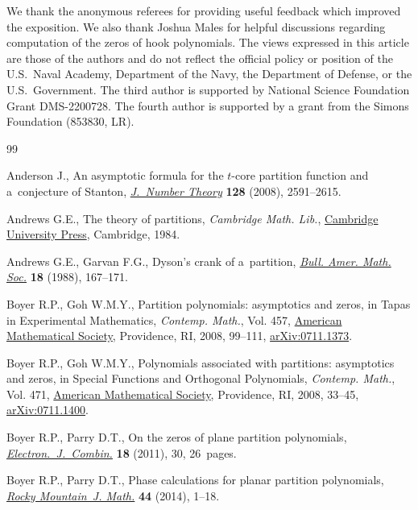 \documentclass[pdftex]{sigma}
\numberwithin{equation}{section}
\begin{document}
We thank the anonymous referees for providing useful feedback which improved the exposition. We also thank Joshua Males for helpful discussions regarding computation of the zeros of hook polynomials. The views expressed in this article are those of the authors and do not reflect the official policy or position of the U.S.\ Naval Academy, Department of the Navy, the Department of Defense, or the U.S.\ Government. The third author is supported by National Science Foundation Grant DMS-2200728.  The fourth author is supported by a grant from the Simons Foundation (853830, LR).

\newpage

\begin{thebibliography}{99}
\footnotesize\itemsep=0pt

Anderson J., An asymptotic formula for the {$t$}-core partition function and
 a~conjecture of {S}tanton, \href{https://doi.org/10.1016/j.jnt.2007.10.006}{\textit{J.~Number Theory}} \textbf{128} (2008),
 2591--2615.

Andrews G.E., The theory of partitions, \textit{Cambridge Math. Lib.}, \href{https://doi.org/10.1017/CBO9780511608650}{Cambridge
 University Press}, Cambridge, 1984.

Andrews G.E., Garvan F.G., Dyson's crank of a~partition, \href{https://doi.org/10.1090/S0273-0979-1988-15637-6}{\textit{Bull. Amer.
 Math. Soc.}} \textbf{18} (1988), 167--171.

Boyer R.P., Goh W.M.Y., Partition polynomials: asymptotics and zeros, in Tapas
 in Experimental Mathematics, \textit{Contemp. Math.}, Vol. 457, \href{https://doi.org/10.1090/conm/457/08904}{American
 Mathematical Society}, Providence, RI, 2008, 99--111, \href{https://arxiv.org/abs/0711.1373}{arXiv:0711.1373}.

Boyer R.P., Goh W.M.Y., Polynomials associated with partitions: asymptotics and
 zeros, in Special Functions and Orthogonal Polynomials, \textit{Contemp.
 Math.}, Vol. 471, \href{https://doi.org/10.1090/conm/471/09204}{American Mathematical Society}, Providence, RI, 2008,
 33--45, \href{https://arxiv.org/abs/0711.1400}{arXiv:0711.1400}.


Boyer R.P., Parry D.T., On the zeros of plane partition polynomials,
 \href{https://doi.org/10.37236/2026}{\textit{Electron.~J.~Combin.}} \textbf{18} (2011), 30, 26~pages.

Boyer R.P., Parry D.T., Phase calculations for planar partition polynomials,
 \href{https://doi.org/10.1216/RMJ-2014-44-1-1}{\textit{Rocky Mountain~J. Math.}} \textbf{44} (2014), 1--18.


\end{thebibliography}
\end{document}
